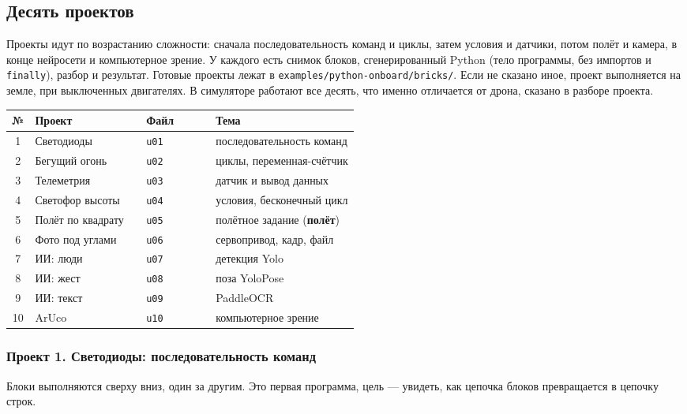 \subsection{Десять проектов}

Проекты идут по возрастанию сложности: сначала последовательность команд и циклы, затем условия и датчики, потом полёт и камера, в конце нейросети и компьютерное зрение. У каждого есть снимок блоков, сгенерированный Python (тело программы, без импортов и \verb|finally|), разбор и результат. Готовые проекты лежат в \texttt{examples/python-onboard/bricks/}. Если не сказано иное, проект выполняется на земле, при выключенных двигателях. В симуляторе работают все десять, что именно отличается от дрона, сказано в разборе проекта.

\begin{center}\small
\begin{tabularx}{\linewidth}{@{}c>{\raggedright\arraybackslash}p{0.32\linewidth}>{\raggedright\arraybackslash}p{0.2\linewidth}X@{}}
\toprule
\textbf{№} & \textbf{Проект} & \textbf{Файл} & \textbf{Тема} \\
\midrule
1 & Светодиоды & \texttt{u01} & последовательность команд \\
2 & Бегущий огонь & \texttt{u02} & циклы, переменная-счётчик \\
3 & Телеметрия & \texttt{u03} & датчик и вывод данных \\
4 & Светофор высоты & \texttt{u04} & условия, бесконечный цикл \\
5 & Полёт по квадрату & \texttt{u05} & полётное задание (\textbf{полёт}) \\
6 & Фото под углами & \texttt{u06} & сервопривод, кадр, файл \\
7 & ИИ: люди & \texttt{u07} & детекция Yolo \\
8 & ИИ: жест & \texttt{u08} & поза YoloPose \\
9 & ИИ: текст & \texttt{u09} & PaddleOCR \\
10 & ArUco & \texttt{u10} & компьютерное зрение \\
\bottomrule
\end{tabularx}
\end{center}

\subsubsection*{Проект 1. Светодиоды: последовательность команд}

Блоки выполняются сверху вниз, один за другим. Это первая программа, цель --- увидеть, как цепочка блоков превращается в цепочку строк.

